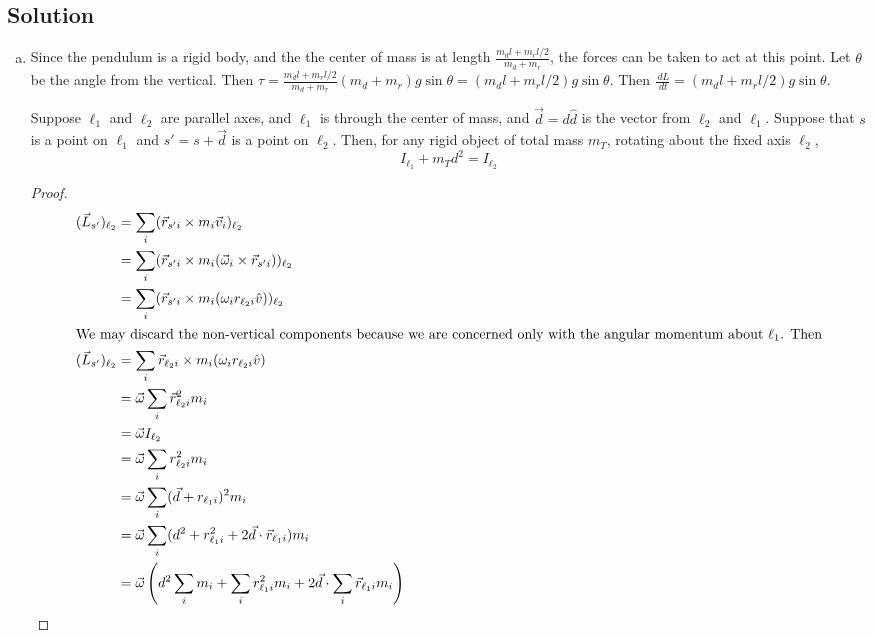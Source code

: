 \documentclass[solutions]{esg8012pset}
\renewcommand{\d}{\,d}
\begin{document}
\subsection{Solution}
  \begin{enumerate}[(a)]
    \item Since the pendulum is a rigid body, and the the center of mass is at length $\frac{m_d l + m_r l / 2}{m_d + m_r}$, the forces can be taken to act at this point.  Let $\theta$ be the angle from the vertical.  Then $\tau = \frac{m_d l + m_r l / 2}{m_d + m_r} (m_d + m_r)g\sin\theta = (m_d l + m_r l / 2)g\sin\theta$.  Then $\frac{\d L}{\d t} = (m_d l + m_r l / 2)g\sin\theta$.
    \begin{thm}
    Suppose $\ell_1$ and $\ell_2$ are parallel axes, and $\ell_1$ is through the center of mass, and $\vec d = d\hat d$ is the vector from $\ell_2$ and $\ell_1$.  Suppose that $s$ is a point on $\ell_1$ and $s' = s + \vec d$ is a point on $\ell_2$.  Then, for any rigid object of total mass $m_T$, rotating about the fixed axis $\ell_2$, \begin{equation} I_{\ell_1} + m_T d^2 = I_{\ell_2} \end{equation}
    \end{thm}
    \begin{proof}
      \begin{align*}
        (\vec L_{s'})_{\ell_2} & = \sum_i (\vec r_{s'i} \times m_i\vec v_i)_{\ell_2} \\
        & = \sum_i (\vec r_{s'i} \times m_i(\vec \omega_i \times \vec r_{s'i}))_{\ell_2} \\
        & = \sum_i (\vec r_{s'i} \times m_i(\omega_i r_{\ell_2 i} \hat v))_{\ell_2} \\
  \intertext{We may discard the non-vertical components because we are concerned only with the angular momentum about $\ell_1$.  Then}
        (\vec L_{s'})_{\ell_2} & = \sum_i \vec r_{\ell_2 i} \times m_i(\omega_i r_{\ell_2 i} \hat v) \\
        & = \vec \omega \sum_i \vec r_{\ell_2 i}^2 m_i \\
        & = \vec \omega I_{\ell_2} \\
        & = \vec \omega \sum_i r_{\ell_2 i}^2 m_i \\
        & = \vec \omega \sum_i (\vec d + r_{\ell_1 i})^2 m_i \\
        & = \vec \omega \sum_i (d^2 + r_{\ell_1 i}^2 + 2\vec d \cdot \vec r_{\ell_1 i}) m_i \\
        & = \vec \omega \left( d^2 \sum_i m_i +  \sum_i r_{\ell_1 i}^2 m_i + 2\vec d \cdot \sum_i \vec r_{\ell_1 i} m_i \right) \\

\end{align*}
\end{proof}
\end{enumerate}
\end{document}
